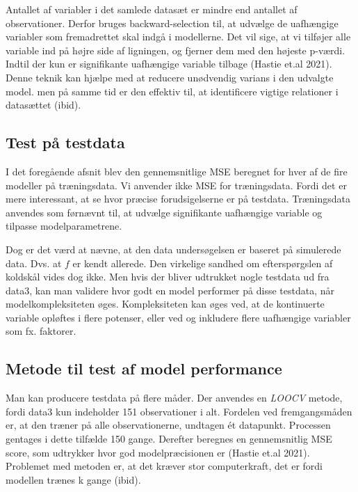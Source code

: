 \documentclass[
  12pt,
  a4paper,
  DIV=11,
  numbers=noendperiod]{scrartcl}
\begin{document}
Antallet af variabler i det samlede datasæt er mindre end antallet af
observationer. Derfor bruges backward-selection til, at udvælge de
uafhængige variabler som fremadrettet skal indgå i modellerne. Det vil
sige, at vi tilføjer alle variable ind på højre side af ligningen, og
fjerner dem med den højeste p-værdi. Indtil der kun er signifikante
uafhængige variable tilbage (Hastie et.al 2021). Denne teknik kan hjælpe
med at reducere unødvendig varians i den udvalgte model. men på samme
tid er den effektiv til, at identificere vigtige relationer i datasættet
(ibid).

\hypertarget{test-puxe5-testdata}{%
\subsection{Test på testdata}\label{test-puxe5-testdata}}

I det foregående afsnit blev den gennemsnitlige MSE beregnet for hver af
de fire modeller på træningsdata. Vi anvender ikke MSE for træningsdata.
Fordi det er mere interessant, at se hvor præcise forudsigelserne er på
testdata. Træningsdata anvendes som førnævnt til, at udvælge
signifikante uafhængige variable og tilpasse modelparametrene.

Dog er det værd at nævne, at den data undersøgelsen er baseret på
simulerede data. Dvs. at \(f\) er kendt allerede. Den virkelige sandhed
om efterspørgslen af koldskål vides dog ikke. Men hvis der bliver
udtrukket nogle testdata ud fra data3, kan man validere hvor godt en
model performer på disse testdata, når modelkompleksiteten øges.
Kompleksiteten kan øges ved, at de kontinuerte variable opløftes i flere
potenser, eller ved og inkludere flere uafhængige variabler som fx.
faktorer.

\hypertarget{metode-til-test-af-model-performance}{%
\subsection{Metode til test af model
performance}\label{metode-til-test-af-model-performance}}

Man kan producere testdata på flere måder. Der anvendes en \emph{LOOCV}
metode, fordi data3 kun indeholder 151 observationer i alt. Fordelen ved
fremgangsmåden er, at den træner på alle observationerne, undtagen ét
datapunkt. Processen gentages i dette tilfælde 150 gange. Derefter
beregnes en gennemsnitlig MSE score, som udtrykker hvor god
modelpræcisionen er (Hastie et.al 2021). Problemet med metoden er, at
det kræver stor computerkraft, det er fordi modellen trænes k gange
(ibid).
\end{document}
